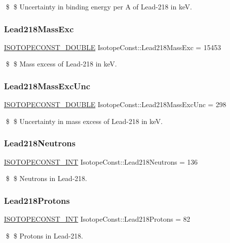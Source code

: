\$ \$ Uncertainty in binding energy per A of Lead-\/218 in keV. \mbox{\label{group___isotope_const-_lead-_pb218_ga94ec2f7c5ac785120e3a4f02a18c8d71}} 
\subsubsection{\texorpdfstring{Lead218\+Mass\+Exc}{Lead218MassExc}}
{\footnotesize\ttfamily \mbox{\hyperlink{group___isotope_const-_macros_ga8f45a7272ce02c0b4c65c44636ed719a}{I\+S\+O\+T\+O\+P\+E\+C\+O\+N\+S\+T\+\_\+\+D\+O\+U\+B\+LE}} Isotope\+Const\+::\+Lead218\+Mass\+Exc = 15453}

\$ \$ Mass excess of Lead-\/218 in keV. \mbox{\label{group___isotope_const-_lead-_pb218_ga020c5b90f5d7e36b56cdfcccc5c02e4d}} 
\subsubsection{\texorpdfstring{Lead218\+Mass\+Exc\+Unc}{Lead218MassExcUnc}}
{\footnotesize\ttfamily \mbox{\hyperlink{group___isotope_const-_macros_ga8f45a7272ce02c0b4c65c44636ed719a}{I\+S\+O\+T\+O\+P\+E\+C\+O\+N\+S\+T\+\_\+\+D\+O\+U\+B\+LE}} Isotope\+Const\+::\+Lead218\+Mass\+Exc\+Unc = 298}

\$ \$ Uncertainty in mass excess of Lead-\/218 in keV. \mbox{\label{group___isotope_const-_lead-_pb218_ga59297672444aab29e2c0c92a5db4c034}} 
\subsubsection{\texorpdfstring{Lead218\+Neutrons}{Lead218Neutrons}}
{\footnotesize\ttfamily \mbox{\hyperlink{group___isotope_const-_macros_ga5f18360b3e99483a35c32d789e62621c}{I\+S\+O\+T\+O\+P\+E\+C\+O\+N\+S\+T\+\_\+\+I\+NT}} Isotope\+Const\+::\+Lead218\+Neutrons = 136}

\$ \$ Neutrons in Lead-\/218. \mbox{\label{group___isotope_const-_lead-_pb218_gaf5e40294d796905c917b6ff962cd8346}} 
\subsubsection{\texorpdfstring{Lead218\+Protons}{Lead218Protons}}
{\footnotesize\ttfamily \mbox{\hyperlink{group___isotope_const-_macros_ga5f18360b3e99483a35c32d789e62621c}{I\+S\+O\+T\+O\+P\+E\+C\+O\+N\+S\+T\+\_\+\+I\+NT}} Isotope\+Const\+::\+Lead218\+Protons = 82}

\$ \$ Protons in Lead-\/218. 